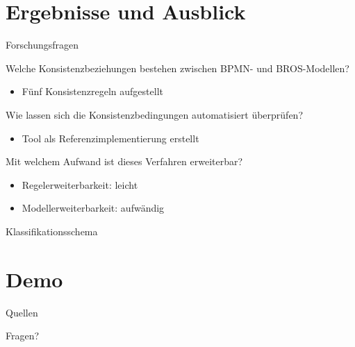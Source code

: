\section{Ergebnisse und Ausblick}

\begin{frame}{Forschungsfragen}
  \begin{description}[4cm]
    \item[F1] Welche Konsistenzbeziehungen bestehen zwischen BPMN- und BROS-Modellen?
    \begin{itemize}
      \item Fünf Konsistenzregeln aufgestellt
    \end{itemize}

    \item[F2] Wie lassen sich die Konsistenzbedingungen automatisiert überprüfen?
    \begin{itemize}
      \item Tool als Referenzimplementierung erstellt
    \end{itemize}

    \item[F3] Mit welchem Aufwand ist dieses Verfahren erweiterbar?
    \begin{itemize}
      \item Regelerweiterbarkeit: leicht
      \item Modellerweiterbarkeit: aufwändig
    \end{itemize}
  \end{description}
\end{frame}

\begin{frame}{Klassifikationsschema}
  
\end{frame}

\section{Demo}

\begin{frame}[allowframebreaks]{Quellen}
  \printbibliography[heading=none]
\end{frame}

\begin{frame}[standout]
  Fragen?
\end{frame}
